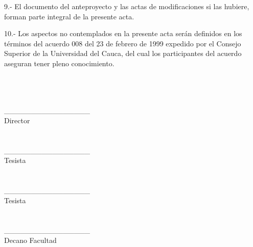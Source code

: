 9.- El documento del anteproyecto y las actas de modificaciones si las hubiere, forman parte integral de la presente acta.

10.- Los aspectos no contemplados en la presente acta serán definidos en los términos del acuerdo 008 del 23 de febrero de 1999 expedido por el Consejo Superior de la Universidad del Cauca, del cual los participantes del acuerdo aseguran tener pleno conocimiento. 

~\\~\\~\\

\noindent
\_\_\_\_\_\_\_\_\_\_\_\_\_\_\_\_~\\
Director 
~\\~\\~\\


\noindent
\_\_\_\_\_\_\_\_\_\_\_\_\_\_\_\_~\\
Tesista
~\\~\\~\\

\noindent
 \_\_\_\_\_\_\_\_\_\_\_\_\_\_\_\_~\\
Tesista
~\\~\\~\\


\noindent
 \_\_\_\_\_\_\_\_\_\_\_\_\_\_\_\_~\\
Decano Facultad




